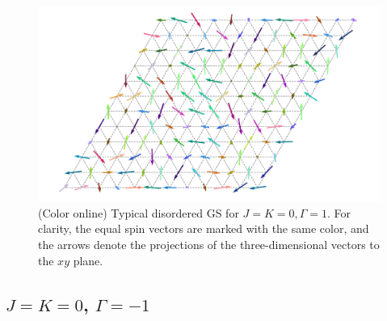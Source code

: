 \documentclass[aps,prb,reprint,amsfonts,amsmath,amssymb,showpacs,groupedaddress,superscriptaddress]{revtex4-1}
\begin{document}
\begin{figure}
    \centering
    \includegraphics[width=\columnwidth]{SpinConfigForPositiveGamma.pdf}
    \caption{\label{fig:GSForPositiveGamma}(Color online) Typical disordered GS for $J=K=0, \Gamma=1$. For clarity, the equal spin vectors are marked with the same color, and the arrows denote the projections of the three-dimensional vectors to the $xy$ plane.}
\end{figure}

\subsection{$J=K=0$, $\Gamma=-1$}
\end{document}
